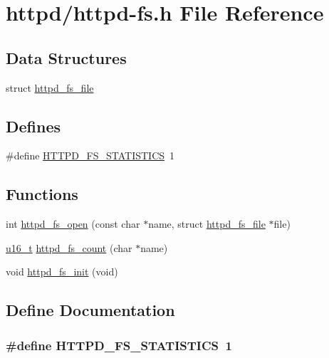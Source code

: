 \hypertarget{httpd-fs_8h}{
\section{httpd/httpd-\/fs.h File Reference}
\label{httpd-fs_8h}
}
\subsection*{Data Structures}
\begin{DoxyCompactItemize}
\item 
struct \hyperlink{structhttpd__fs__file}{httpd\_\-fs\_\-file}
\end{DoxyCompactItemize}
\subsection*{Defines}
\begin{DoxyCompactItemize}
\item 
\#define \hyperlink{httpd-fs_8h_ae9034b8a5dc57cfc988bd34d273833f2}{HTTPD\_\-FS\_\-STATISTICS}~1
\end{DoxyCompactItemize}
\subsection*{Functions}
\begin{DoxyCompactItemize}
\item 
int \hyperlink{httpd-fs_8h_ad5e3d1a458b56855d6a757a3b4b188cd}{httpd\_\-fs\_\-open} (const char $\ast$name, struct \hyperlink{structhttpd__fs__file}{httpd\_\-fs\_\-file} $\ast$file)
\item 
\hyperlink{group__uipfw_ga77570ac4fcab86864fa1916e55676da2}{u16\_\-t} \hyperlink{httpd-fs_8h_a87c42bb111e62e0d98cce26d2c2208af}{httpd\_\-fs\_\-count} (char $\ast$name)
\item 
void \hyperlink{httpd-fs_8h_abefee428190eea7014a01b03e64f4c09}{httpd\_\-fs\_\-init} (void)
\end{DoxyCompactItemize}


\subsection{Define Documentation}
\hypertarget{httpd-fs_8h_ae9034b8a5dc57cfc988bd34d273833f2}{
\subsubsection[{HTTPD\_\-FS\_\-STATISTICS}]{\setlength{\rightskip}{0pt plus 5cm}\#define HTTPD\_\-FS\_\-STATISTICS~1}}
\label{httpd-fs_8h_ae9034b8a5dc57cfc988bd34d273833f2}


